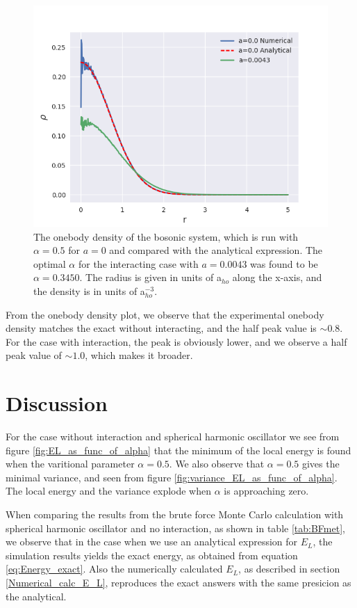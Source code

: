 \documentclass[norsk,a4paper,12pt]{article}
\begin{document}
\begin{figure} [H]
    \centering
    \includegraphics[scale=0.80]{images/ob.png}
    \caption{The onebody density of the bosonic system, which is run with $\alpha=0.5$ for $a=0$ and compared with the analytical expression. The optimal $\alpha$ for the interacting case with $a=0.0043$ was found to be $\alpha = 0.3450$. The radius is given in units of a$_{ho}$ along the x-axis, and the density is in units of a$_{ho}^{-3}$.}
    \label{fig:ob0}
\end{figure}

From the onebody density plot, we observe that the experimental onebody density matches the exact without interacting, and the half peak value is $\sim 0.8$. For the case with interaction, the peak is obviously lower, and we observe a half peak value of $\sim 1.0$, which makes it broader.

\section{Discussion} \label{Discussion}
For the case without interaction and spherical harmonic oscillator we see from figure \ref{fig:EL_as_func_of_alpha} that the minimum of the local energy is found when the varitional parameter $\alpha=0.5$. We also observe that $\alpha=0.5$ gives the minimal variance, and seen from figure \ref{fig:variance_EL_as_func_of_alpha}. The local energy and the variance explode when $\alpha$ is approaching zero.  
\par 
\vspace{3mm}

When comparing the results from the brute force Monte Carlo calculation with spherical harmonic oscillator and no interaction, as shown in table \ref{tab:BFmet}, we observe that in the case when we use an analytical expression for $E_L$, the simulation results yields the exact energy, as obtained from equation \ref{eq:Energy_exact}. Also the numerically calculated $E_L$, as described in section \ref{Numerical_calc_E_L}, reproduces the exact answers with the same presicion as the analytical. 
\end{document}

